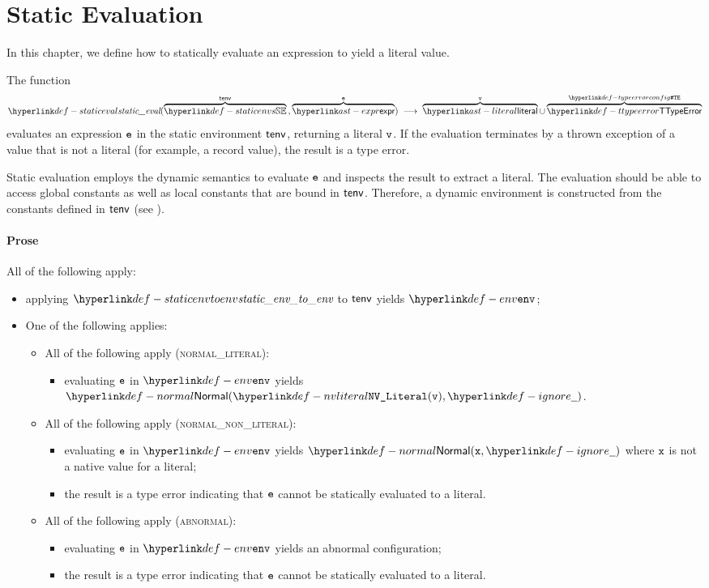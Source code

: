 \chapter{Static Evaluation\label{chap:StaticEvaluation}}

In this chapter, we define how to statically evaluate an expression
to yield a literal value.

\hypertarget{def-staticeval}{}
The function
\[
  \staticeval(\overname{\staticenvs}{\tenv} \aslsep \overname{\expr}{\ve}) \;\aslto\;
  \overname{\literal}{\vv} \cup
  \overname{\TTypeError}{\TypeErrorConfig}
\]
evaluates an expression $\texttt{e}$
in the static environment $\textsf{tenv}$, returning a literal $\texttt{v}$.
If the evaluation terminates by a thrown exception of a value that is not a literal
(for example, a record value), the result is a type error.

Static evaluation employs the dynamic semantics to evaluate $\texttt{e}$ and inspects the result to extract
a literal. The evaluation should be able to access global constants as well as local constants that
are bound in $\textsf{tenv}$. Therefore, a dynamic environment is constructed from the constants defined in $\textsf{tenv}$
(see ).

\subsubsection{Prose}
All of the following apply:
\begin{itemize}
  \item applying $\staticenvtoenv$ to $\textsf{tenv}$ yields $\env$;
  \item One of the following applies:
  \begin{itemize}
    \item All of the following apply (\textsc{normal\_literal}):
    \begin{itemize}
      \item evaluating $\texttt{e}$ in $\env$ yields $\Normal(\nvliteral{\vv}, \Ignore)$.
    \end{itemize}

    \item All of the following apply (\textsc{normal\_non\_literal}):
    \begin{itemize}
      \item evaluating $\texttt{e}$ in $\env$ yields $\Normal(\vx, \Ignore)$
            where $\texttt{x}$ is not a native value for a literal;
      \item the result is a type error indicating that $\texttt{e}$ cannot be statically evaluated to a literal.
    \end{itemize}

    \item All of the following apply (\textsc{abnormal}):
    \begin{itemize}
      \item evaluating $\texttt{e}$ in $\env$ yields an abnormal configuration;
      \item the result is a type error indicating that $\texttt{e}$ cannot be statically evaluated to a literal.
    \end{itemize}
  \end{itemize}
\end{itemize}

